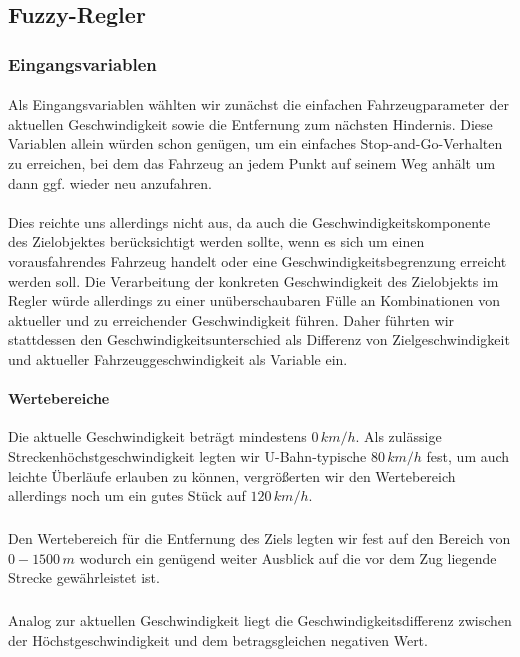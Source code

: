 \documentclass[10pt,a4paper]{article}
\begin{document}
\subsection{Fuzzy-Regler}

\subsubsection{Eingangsvariablen}
\paragraph{}
Als Eingangsvariablen wählten wir zunächst die einfachen Fahrzeugparameter der aktuellen Geschwindigkeit sowie die Entfernung zum nächsten Hindernis. Diese Variablen allein würden schon genügen, um ein einfaches Stop-and-Go-Verhalten zu erreichen, bei dem das Fahrzeug an jedem Punkt auf seinem Weg anhält um dann ggf. wieder neu anzufahren.
\paragraph{}
Dies reichte uns allerdings nicht aus, da auch die Geschwindigkeitskomponente des Zielobjektes berücksichtigt werden sollte, wenn es sich um einen vorausfahrendes Fahrzeug handelt oder eine Geschwindigkeitsbegrenzung erreicht werden soll.
Die Verarbeitung der konkreten Geschwindigkeit des Zielobjekts im Regler würde allerdings zu einer unüberschaubaren Fülle an Kombinationen von aktueller und zu erreichender Geschwindigkeit führen. Daher führten wir stattdessen den Geschwindigkeitsunterschied als Differenz von Zielgeschwindigkeit und aktueller Fahrzeuggeschwindigkeit als Variable ein.
\paragraph{Wertebereiche}
Die aktuelle Geschwindigkeit beträgt mindestens $ 0\, km/h $. Als zulässige Streckenhöchstgeschwindigkeit legten wir U-Bahn-typische $ 80\, km/h $ fest, um auch leichte Überläufe erlauben zu können, vergrößerten wir den Wertebereich allerdings noch um ein gutes Stück auf $ 120\, km/h $.
\subparagraph{}
Den Wertebereich für die Entfernung des Ziels legten wir fest auf den Bereich von $ 0 - 1500 \, m $ wodurch ein genügend weiter Ausblick auf die vor dem Zug liegende Strecke gewährleistet ist.
\subparagraph{}
Analog zur aktuellen Geschwindigkeit liegt die Geschwindigkeitsdifferenz zwischen der Höchstgeschwindigkeit und dem betragsgleichen negativen Wert.
\end{document}
